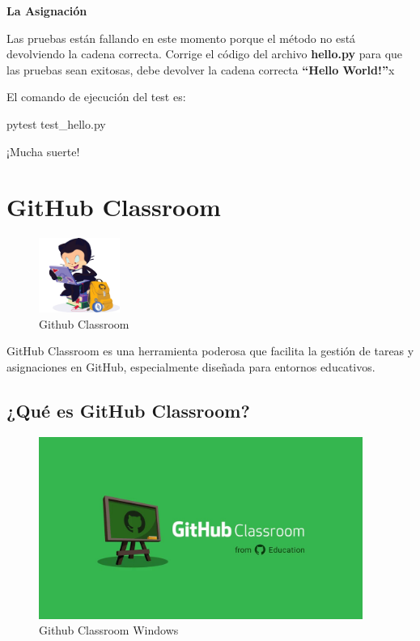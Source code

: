 \documentclass[
  a4paper,
  DIV=11,
  numbers=noendperiod,
  onepage,
  openany]{scrreprt}
\newenvironment{Shaded}{\begin{snugshade}}{\end{snugshade}}
\newcommand{\ExtensionTok}[1]{\textcolor[rgb]{0.00,0.23,0.31}{#1}}
\newcommand{\NormalTok}[1]{\textcolor[rgb]{0.00,0.23,0.31}{#1}}
\begin{document}
\textbf{La Asignación}

Las pruebas están fallando en este momento porque el método no está
devolviendo la cadena correcta. Corrige el código del archivo
\textbf{hello.py} para que las pruebas sean exitosas, debe devolver la
cadena correcta \textbf{``Hello World!''}x

El comando de ejecución del test es:

\begin{Shaded}
\begin{Highlighting}[]
\ExtensionTok{pytest}\NormalTok{ test\_hello.py}
\end{Highlighting}
\end{Shaded}

¡Mucha suerte!

\chapter{GitHub Classroom 📒}\label{github-classroom}

\begin{figure}[H]

{\centering \includegraphics[width=1.04167in,height=\textheight,keepaspectratio]{unidades/unidad0/../../images/github classroom.png}

}

\caption{Github Classroom}

\end{figure}%

GitHub Classroom es una herramienta poderosa que facilita la gestión de
tareas y asignaciones en GitHub, especialmente diseñada para entornos
educativos.

\section{¿Qué es GitHub Classroom? 🤔}\label{quuxe9-es-github-classroom}

\begin{figure}[H]

{\centering \includegraphics[width=4.16667in,height=\textheight,keepaspectratio]{unidades/unidad0/../../images/github-classroom-ventana.jpg}

}

\caption{Github Classroom Windows}

\end{figure}%
\end{document}
